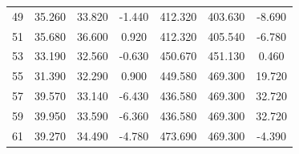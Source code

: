 \begin{table}[t]
\begin{tabular}{ccccccc}
49 & 35.260 & 33.820 & -1.440 & 412.320 & 403.630 & -8.690 \\
51 & 35.680 & 36.600 & 0.920 & 412.320 & 405.540 & -6.780 \\
53 & 33.190 & 32.560 & -0.630 & 450.670 & 451.130 & 0.460 \\
55 & 31.390 & 32.290 & 0.900 & 449.580 & 469.300 & 19.720 \\
57 & 39.570 & 33.140 & -6.430 & 436.580 & 469.300 & 32.720 \\
59 & 39.950 & 33.590 & -6.360 & 436.580 & 469.300 & 32.720 \\
61 & 39.270 & 34.490 & -4.780 & 473.690 & 469.300 & -4.390 \\
\hline
\end{tabular}
\end{table}
